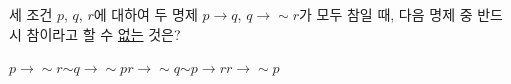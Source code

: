 세 조건 $p$, $q$, $r$에 대하여 두 명제 $p\longrightarrow q$, $q\longrightarrow \sim r$가 모두 참일 때, 다음 명제 중 반드시 참이라고 할 수 \underline{없는} 것은?
\begin{choices32}{$p\longrightarrow \sim r$}{$\sim q\longrightarrow \sim p$}{$r\longrightarrow \sim q$}{$\sim p\longrightarrow r$}{$r\longrightarrow \sim p$}\end{choices32}
